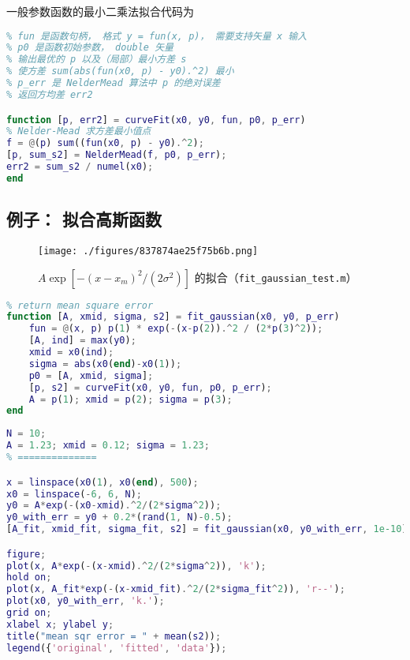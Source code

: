 一般参数函数的最小二乘法拟合代码为
\begin{lstlisting}[language=matlab, caption=curveFit.m]
% 最小二乘法拟合一元实函数，(x0,y0) 是数据点
% fun 是函数句柄， 格式 y = fun(x, p)， 需要支持矢量 x 输入
% p0 是函数初始参数， double 矢量
% 输出最优的 p 以及（局部）最小方差 s
% 使方差 sum(abs(fun(x0, p) - y0).^2) 最小
% p_err 是 NelderMead 算法中 p 的绝对误差
% 返回方均差 err2

function [p, err2] = curveFit(x0, y0, fun, p0, p_err)
% Nelder-Mead 求方差最小值点
f = @(p) sum((fun(x0, p) - y0).^2);
[p, sum_s2] = NelderMead(f, p0, p_err);
err2 = sum_s2 / numel(x0);
end
\end{lstlisting}

\subsection{例子： 拟合高斯函数}
\begin{figure}[ht]
\centering
\texttt{[image: ./figures/837874ae25f75b6b.png]}
\caption{ $A\exp[-(x-x_m)^2/(2\sigma^2)]$ 的拟合（\verb|fit_gaussian_test.m|）} \label{fig_CurFit_2}
\end{figure}

\begin{lstlisting}[language=matlab,caption=fit\_gaussian.m]
% fit a gaussian distribution
% return mean square error
function [A, xmid, sigma, s2] = fit_gaussian(x0, y0, p_err)
    fun = @(x, p) p(1) * exp(-(x-p(2)).^2 / (2*p(3)^2));
    [A, ind] = max(y0);
    xmid = x0(ind);
    sigma = abs(x0(end)-x0(1));
    p0 = [A, xmid, sigma];
    [p, s2] = curveFit(x0, y0, fun, p0, p_err);
    A = p(1); xmid = p(2); sigma = p(3);
end
\end{lstlisting}

\begin{lstlisting}[language=matlab,caption=fit\_gaussian\_test.m]
% === params ===
N = 10;
A = 1.23; xmid = 0.12; sigma = 1.23;
% ==============

x = linspace(x0(1), x0(end), 500);
x0 = linspace(-6, 6, N);
y0 = A*exp(-(x0-xmid).^2/(2*sigma^2));
y0_with_err = y0 + 0.2*(rand(1, N)-0.5);
[A_fit, xmid_fit, sigma_fit, s2] = fit_gaussian(x0, y0_with_err, 1e-10);

figure;
plot(x, A*exp(-(x-xmid).^2/(2*sigma^2)), 'k');
hold on;
plot(x, A_fit*exp(-(x-xmid_fit).^2/(2*sigma_fit^2)), 'r--');
plot(x0, y0_with_err, 'k.');
grid on;
xlabel x; ylabel y;
title("mean sqr error = " + mean(s2));
legend({'original', 'fitted', 'data'});
\end{lstlisting}
